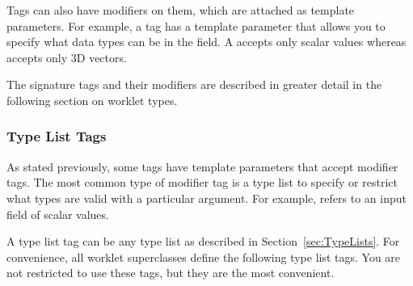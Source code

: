 Tags can also have modifiers on them, which are attached as template
parameters. For example, a  tag has a template parameter
that allows you to specify what data types can be in the field. A
 accepts only scalar values whereas
 accepts only 3D vectors.

The signature tags and their modifiers are described in greater detail in
the following section on worklet types.

\subsubsection{Type List Tags}
\label{sec:TypeListTags}


As stated previously, some \controlsignature tags have template parameters
that accept modifier tags. The most common type of modifier tag is a type
list to specify or restrict what types are valid with a particular
argument. For example,  refers to an input field
of scalar values.

A type list tag can be any type list as described in
Section~\ref{sec:TypeLists}. For convenience, all worklet superclasses
define the following type list tags. You are not restricted to use these
tags, but they are the most convenient.

